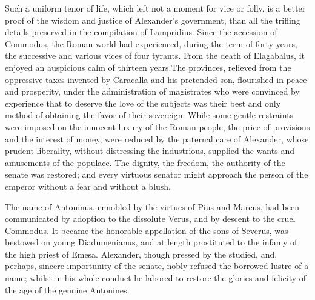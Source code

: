 

Such a uniform tenor of life, which left not a moment for vice or
folly, is a better proof of the wisdom and justice of Alexander’s
government, than all the trifling details preserved in the
compilation of Lampridius. Since the accession of Commodus, the
Roman world had experienced, during the term of forty years, the
successive and various vices of four tyrants. From the death of
Elagabalus, it enjoyed an auspicious calm of thirteen years.\footnotemark[711]
The provinces, relieved from the oppressive taxes invented by
Caracalla and his pretended son, flourished in peace and
prosperity, under the administration of magistrates who were
convinced by experience that to deserve the love of the subjects
was their best and only method of obtaining the favor of their
sovereign. While some gentle restraints were imposed on the
innocent luxury of the Roman people, the price of provisions and
the interest of money, were reduced by the paternal care of
Alexander, whose prudent liberality, without distressing the
industrious, supplied the wants and amusements of the populace.
The dignity, the freedom, the authority of the senate was
restored; and every virtuous senator might approach the person of
the emperor without a fear and without a blush.


The name of Antoninus, ennobled by the virtues of Pius and
Marcus, had been communicated by adoption to the dissolute Verus,
and by descent to the cruel Commodus. It became the honorable
appellation of the sons of Severus, was bestowed on young
Diadumenianus, and at length prostituted to the infamy of the
high priest of Emesa. Alexander, though pressed by the studied,
and, perhaps, sincere importunity of the senate, nobly refused
the borrowed lustre of a name; whilst in his whole conduct he
labored to restore the glories and felicity of the age of the
genuine Antonines.\footnotemark[72]



